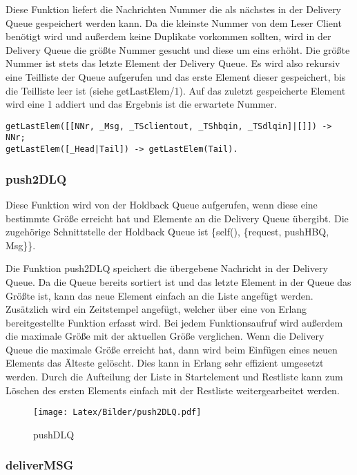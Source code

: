 Diese Funktion liefert die Nachrichten Nummer die als nächstes in der Delivery Queue gespeichert werden kann. Da die kleinste Nummer von dem Leser Client benötigt wird und außerdem keine Duplikate vorkommen sollten, wird in der Delivery Queue die größte Nummer gesucht und diese um eins erhöht. Die größte Nummer ist stets das letzte Element der Delivery Queue. Es wird also rekursiv eine Teilliste der Queue aufgerufen und das erste Element dieser gespeichert, bis die Teilliste leer ist (siehe getLastElem/1). Auf das zuletzt gespeicherte Element wird eine 1 addiert und das Ergebnis ist die erwartete Nummer. 
\begin{lstlisting} 
getLastElem([[NNr, _Msg, _TSclientout, _TShbqin, _TSdlqin]|[]]) -> NNr;
getLastElem([_Head|Tail]) -> getLastElem(Tail).
\end{lstlisting}

\subsubsection{push2DLQ}

Diese Funktion wird von der Holdback Queue aufgerufen, wenn diese eine bestimmte Größe erreicht hat und Elemente an die Delivery Queue übergibt. Die zugehörige Schnittstelle der Holdback Queue ist \{self(), \{request, pushHBQ, Msg\}\}.

Die Funktion push2DLQ speichert die übergebene Nachricht in der Delivery Queue. Da die Queue bereits sortiert ist und das letzte Element in der Queue das Größte ist, kann das neue Element einfach an die Liste angefügt werden. Zusätzlich wird ein Zeitstempel angefügt, welcher über eine von Erlang bereitgestellte Funktion erfasst wird. 
Bei jedem Funktionsaufruf wird außerdem die maximale Größe mit der aktuellen Größe verglichen. Wenn die Delivery Queue die maximale Größe erreicht hat, dann wird beim Einfügen eines neuen Elements das Älteste gelöscht. Dies kann in Erlang sehr effizient umgesetzt werden. Durch die Aufteilung der Liste in Startelement und Restliste kann zum Löschen des ersten Elements einfach mit der Restliste weitergearbeitet werden. 

\begin{figure}[htbp]
\begin{center}
\texttt{[image: Latex/Bilder/push2DLQ.pdf]}
\caption{pushDLQ}\label{fig:pushDLQ}
\end{center}
\end{figure}

\subsubsection{deliverMSG}


